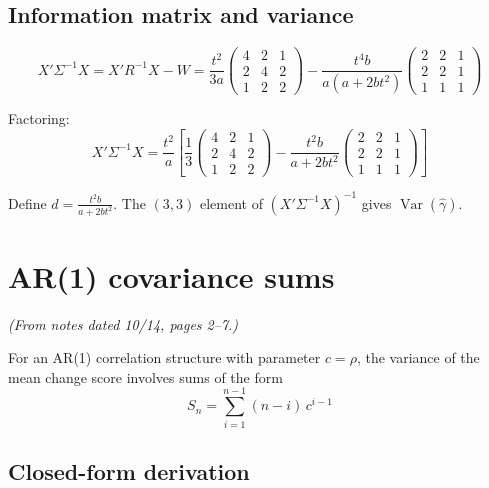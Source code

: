 \documentclass[11pt]{article}
\DeclareMathOperator{\Var}{Var}
\begin{document}
\subsection{Information matrix and variance}

\begin{equation}
  X'\Sigma^{-1}X = X'R^{-1}X - W
  = \frac{t^2}{3a}\begin{pmatrix}
    4&2&1\\2&4&2\\1&2&2
  \end{pmatrix}
  - \frac{t^4 b}{a(a+2bt^2)}\begin{pmatrix}
    2&2&1\\2&2&1\\1&1&1
  \end{pmatrix}
\end{equation}

Factoring:
\begin{equation}
  X'\Sigma^{-1}X = \frac{t^2}{a}\left[
    \frac{1}{3}\begin{pmatrix}
      4&2&1\\2&4&2\\1&2&2
    \end{pmatrix}
    - \frac{t^2 b}{a+2bt^2}\begin{pmatrix}
      2&2&1\\2&2&1\\1&1&1
    \end{pmatrix}
  \right]
  \label{eq:XSigX_frost}
\end{equation}

Define $d = \frac{t^2 b}{a + 2bt^2}$. The $(3,3)$ element
of $(X'\Sigma^{-1}X)^{-1}$ gives $\Var(\hat\gamma)$.


\section{AR(1) covariance sums}
\label{sec:ar1}

\noindent
\textit{(From notes dated 10/14, pages 2--7.)}

\medskip
\noindent
For an AR(1) correlation structure with parameter $c = \rho$,
the variance of the mean change score involves sums of the
form
\begin{equation}
  S_n = \sum_{i=1}^{n-1} (n - i)\, c^{i-1}
\end{equation}

\subsection{Closed-form derivation}
\end{document}
